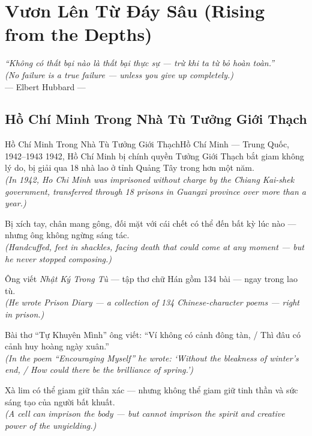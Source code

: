 \chapter{Vươn Lên Từ Đáy Sâu (Rising from the Depths)}
\begin{center}
  \textit{\color{truyengold}``Không có thất bại nào là thất bại thực sự --- trừ khi ta từ bỏ hoàn toàn.''}\\[4pt]
  \textit{(No failure is a true failure --- unless you give up completely.)}\\[4pt]
  \small\color{truyenblue}--- Elbert Hubbard ---
\end{center}
\ngancach

\section{Hồ Chí Minh Trong Nhà Tù Tưởng Giới Thạch}
\begin{truyen}{Hồ Chí Minh Trong Nhà Tù Tưởng Giới Thạch}{Hồ Chí Minh --- Trung Quốc, 1942--1943}
 1942, Hồ Chí Minh bị chính quyền Tưởng Giới Thạch bắt giam không lý do, bị giải qua 18 nhà lao ở tỉnh Quảng Tây trong hơn một năm.\\[4pt]
\textit{(In 1942, Ho Chi Minh was imprisoned without charge by the Chiang Kai-shek government, transferred through 18 prisons in Guangxi province over more than a year.)}

Bị xích tay, chân mang gông, đối mặt với cái chết có thể đến bất kỳ lúc nào --- nhưng ông không ngừng sáng tác.\\[4pt]
\textit{(Handcuffed, feet in shackles, facing death that could come at any moment --- but he never stopped composing.)}

Ông viết \textit{Nhật Ký Trong Tù} --- tập thơ chữ Hán gồm 134 bài --- ngay trong lao tù.\\[4pt]
\textit{(He wrote \textit{Prison Diary} --- a collection of 134 Chinese-character poems --- right in prison.)}

Bài thơ ``Tự Khuyên Mình'' ông viết: ``Ví không có cảnh đông tàn, / Thì đâu có cảnh huy hoàng ngày xuân.''\\[4pt]
\textit{(In the poem ``Encouraging Myself'' he wrote: `Without the bleakness of winter's end, / How could there be the brilliance of spring.')}

\end{truyen}
\begin{baihoc}
  Xà lim có thể giam giữ thân xác --- nhưng không thể giam giữ tinh thần và sức sáng tạo của người bất khuất.\\[4pt]
  \textit{(A cell can imprison the body --- but cannot imprison the spirit and creative power of the unyielding.)}
\end{baihoc}

